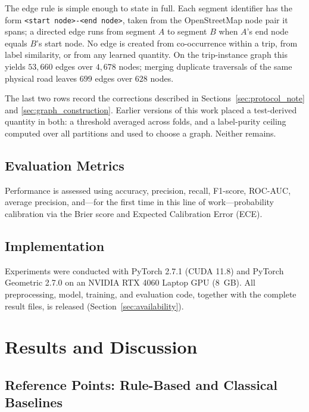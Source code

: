 \documentclass[journal]{IEEEtran}
\begin{document}
The edge rule is simple enough to state in full. Each segment identifier has the form \texttt{<start node>-<end node>}, taken from the OpenStreetMap node pair it spans; a directed edge runs from segment $A$ to segment $B$ when $A$'s end node equals $B$'s start node. No edge is created from co-occurrence within a trip, from label similarity, or from any learned quantity. On the trip-instance graph this yields $53{,}660$ edges over $4{,}678$ nodes; merging duplicate traversals of the same physical road leaves $699$ edges over $628$ nodes.

The last two rows record the corrections described in Sections~\ref{sec:protocol_note} and \ref{sec:graph_construction}. Earlier versions of this work placed a test-derived quantity in both: a threshold averaged across folds, and a label-purity ceiling computed over all partitions and used to choose a graph. Neither remains.

\subsection{Evaluation Metrics}
Performance is assessed using accuracy, precision, recall, F1-score, ROC-AUC, average precision, and---for the first time in this line of work---probability calibration via the Brier score and Expected Calibration Error (ECE).

\subsection{Implementation}
Experiments were conducted with PyTorch 2.7.1 (CUDA 11.8) and PyTorch Geometric 2.7.0 on an NVIDIA RTX 4060 Laptop GPU (8~GB). All preprocessing, model, training, and evaluation code, together with the complete result files, is released (Section~\ref{sec:availability}).

\section{Results and Discussion}
\label{sec:results}

\subsection{Reference Points: Rule-Based and Classical Baselines}
\label{sec:reference_points}
\end{document}
